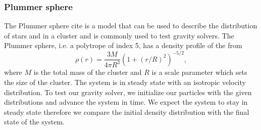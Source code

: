 \subsubsection{Plummer sphere}
The Plummer sphere cite is a model that can be used to describe the distribution of stars and in a cluster
and is commonly used to test gravity solvers. The Plummer sphere, i.e. a polytrope of index 5,
has a density profile of the from
\begin{equation}
	\rho (r) = \frac{3 M}{4\pi R^3} \left(1 + (r/R)^2\right)^{-5/2},
    \label{eq.plummer}
\end{equation}
where $M$ is the total mass of the cluster and $R$ is a scale parameter which sets the
size of the cluster. The system is in steady state with an isotropic velocity distribution.
To test our gravity solver, we initialize our particles with the given distributions and
advance the system in time. We expect the system to stay in steady state therefore we compare
the initial density distribution with the final state of the system.

